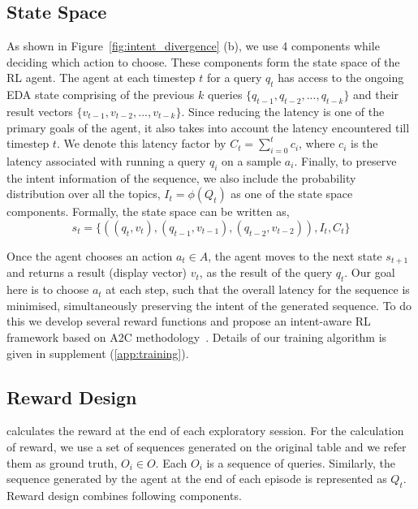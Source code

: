 \subsection{State Space}
As shown in Figure~\ref{fig:intent_divergence} (b), we use 4 components while deciding which action to choose. These components form the state space of the RL agent. The agent at each timestep $t$ for a query $q_t$ has access to the ongoing EDA state comprising of the previous $k$ queries $\{q_{t-1}, q_{t-2}, ..., q_{t-k}\}$ and their result vectors $\{v_{t-1}, v_{t-2}, ..., v_{t-k}\}$. 
Since reducing the latency is one of the primary goals of the agent, it also takes into account the latency encountered till timestep $t$. We denote this latency factor by $C_t=\sum_{i=0}^t c_i$, where $c_i$ is the latency associated with running a query $q_i$ on a sample $a_i$. Finally, to preserve the intent information of the sequence, we also include the probability distribution over all the topics, $I_t = \phi(Q_t)$ as one of the state space components. Formally, the state space can be written as, 
{\small
\begin{equation}
\label{eq:state_space}
    s_t = \{ ((q_{t}, v_{t}),(q_{t-1}, v_{t-1}), (q_{t-2},v_{t-2})), I_t, C_t  \}
\end{equation}
}

Once the agent chooses an action $a_t \in A$, the agent moves to the next state $s_{t+1}$ and returns a result (display vector) $v_t$, as the result of the query $q_t$. Our goal here is to choose $a_t$ at each step, such that the overall latency for the sequence is minimised, simultaneously preserving the intent of the generated sequence. To do this we develop several reward functions and propose an intent-aware RL framework based on A2C methodology~\cite{mnih2016asynchronous}.
Details of our training algorithm is given in supplement (\ref{app:training}).

\subsection{Reward Design}
\label{sec:reward}
\vspace{-0.2em}
\name{} calculates the reward at the end of each exploratory session. For the calculation of reward, we use a set of sequences generated on the original table and we refer them as ground truth, $O_i \in O$. Each $O_i$ is a sequence of queries. Similarly, the sequence generated by the agent at the end of each episode is represented as $Q_t$.
Reward design combines following components.

